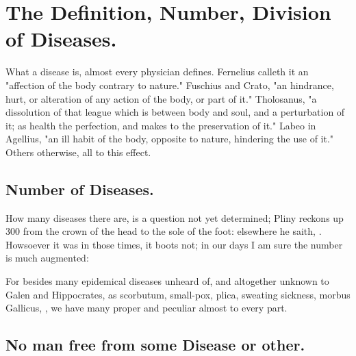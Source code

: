 \section{The Definition, Number, Division of Diseases.}

What a disease is, almost every physician defines.
Fernelius calleth it an "affection of the body contrary to
nature." Fuschius and Crato, "an hindrance, hurt, or
alteration of any action of the body, or part of it."
Tholosanus, "a dissolution of that league which is between
body and soul, and a perturbation of it; as health the perfection, and makes to
the preservation of it." Labeo in Agellius, "an ill habit
of the body, opposite to nature, hindering the use of it." Others otherwise,
all to this effect.

\subsection{Number of Diseases.}

How many diseases there are, is a question not yet determined;
Pliny reckons up 300 from the crown of the head to the sole
of the foot: elsewhere he saith, . Howsoever it was in those times, it boots not; in our days I am
sure the number is much augmented:


For besides many epidemical diseases unheard of, and altogether unknown to
Galen and Hippocrates, as scorbutum, small-pox, plica, sweating sickness,
morbus Gallicus, \etc{}, we have many proper and peculiar almost to every part.

\subsection{No man free from some Disease or other.}

